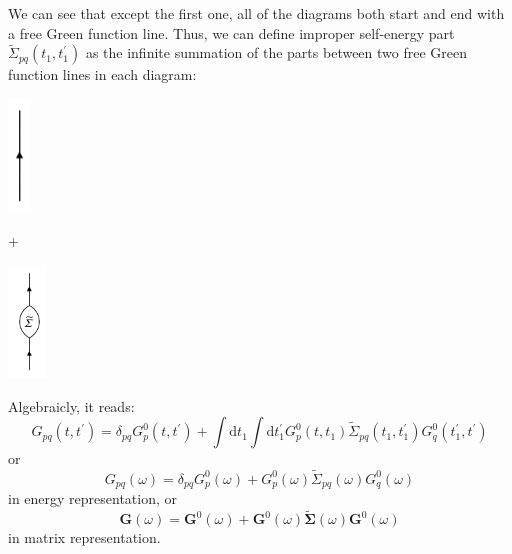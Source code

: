 We can see that except the first one, all of the diagrams both start and end with a free Green function line.
Thus, we can define improper self-energy part $\widetilde{\Sigma}_{p q}\left(t_{1}, t_{1}^{\prime}\right)$ as the infinite summation of the parts between two free Green function lines in each diagram:

\hspace{0.4\textwidth}
\begin{minipage}{0.08\textwidth}
	\includegraphics[height=3cm]{./figures/free.png}
\end{minipage}
\begin{minipage}{0.05\textwidth}
	+
\end{minipage}
\begin{minipage}{0.05\textwidth}
	\includegraphics[height=3cm]{./figures/newdyson.png}
\end{minipage}

Algebraicly, it reads:
\begin{equation}
	G_{p q}\left(t, t^{\prime}\right)=\delta_{p q} G_{p}^{0}\left(t, t^{\prime}\right)+\int \mathrm{d} t_{1} \int \mathrm{d} t_{1}^{\prime} G_{p}^{0}\left(t, t_{1}\right) \widetilde{\Sigma}_{p q}\left(t_{1}, t_{1}^{\prime}\right) G_{q}^{0}\left(t_{1}^{\prime}, t^{\prime}\right)
\end{equation}
or
\begin{equation}
	G_{p q}(\omega)=\delta_{p q} G_{p}^{0}(\omega)+G_{p}^{0}(\omega) \widetilde{\Sigma}_{p q}(\omega) G_{q}^{0}(\omega)
\end{equation}
in energy representation, or 
\begin{equation}
	\boldsymbol{G}(\omega)=\boldsymbol{G}^{0}(\omega)+\boldsymbol{G}^{0}(\omega) \widetilde{\boldsymbol{\Sigma}}(\omega) \boldsymbol{G}^{0}(\omega)
\end{equation}
in matrix representation.

